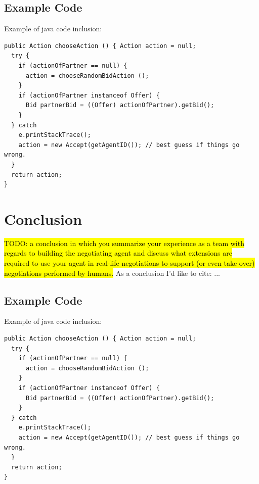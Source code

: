 \documentclass[a4paper,10pt]{article}
\newcommand{\todo}[1] {\hl{TODO: #1}}
\begin{document}
\subsection{Example Code}


Example of java code inclusion:
\begin{lstlisting}
public Action chooseAction () { Action action = null;
  try {
    if (actionOfPartner == null) {
      action = chooseRandomBidAction ();
    }
    if (actionOfPartner instanceof Offer) {
      Bid partnerBid = ((Offer) actionOfPartner).getBid();
    }
  } catch
    e.printStackTrace();
    action = new Accept(getAgentID()); // best guess if things go wrong.
  }
  return action; 
}
\end{lstlisting}

\section{Conclusion}
\label{sec:conclusion}
\todo{a conclusion in which you summarize your experience as a team with regards to building the negotiating agent and discuss what extensions are required to use your agent in real-life negotiations to support (or even take over) negotiations performed by humans.}
As a conclusion I'd like to cite: \cite{baarslag2012decoupling}...

\subsection{Example Code}
Example of java code inclusion:

\begin{lstlisting}
public Action chooseAction () { Action action = null;
  try {
    if (actionOfPartner == null) {
      action = chooseRandomBidAction ();
    }
    if (actionOfPartner instanceof Offer) {
      Bid partnerBid = ((Offer) actionOfPartner).getBid();
    }
  } catch
    e.printStackTrace();
    action = new Accept(getAgentID()); // best guess if things go wrong.
  }
  return action; 
}
\end{lstlisting}



\end{document}
